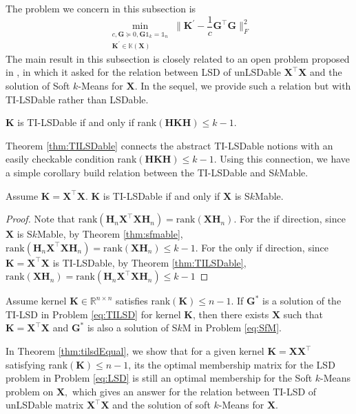 \documentclass[journal]{IEEEtran}
\begin{document}
The problem we concern in this subsection is 
\begin{equation}\label{eq:TILSD}
\min_{\substack{c,\mathbf{G}\succeq 0, \mathbf{G}\mathbb{1}_k = \mathbb{1}_n \\ \mathbf{K}^\prime \in \mathbb{K}(\mathbf{X}) } }
\| \mathbf{K}^\prime - \frac{1}{c}\mathbf{G}^\top\mathbf{G} \|_F^2
\end{equation}
The main result in this subsection is closely related to an open problem proposed in \cite{arora2013similarity},
in which it asked for the relation between LSD of unLSDable $\mathbf{X}^\top\mathbf{X}$ and the solution of Soft $k$-Means for $\mathbf{X}$.
In the sequel, we provide such a relation but with TI-LSDable rather than LSDable.
\begin{thm}\label{thm:TILSDable}
	$\mathbf{K}$ is TI-LSDable if and only if rank$(\mathbf{H}\mathbf{K}\mathbf{H}) \leq k-1$.
\end{thm}
Theorem \ref{thm:TILSDable} connects the abstract TI-LSDable notions with an easily checkable condition rank$(\mathbf{H}\mathbf{K}\mathbf{H}) \leq k-1$.
Using this connection, we have a simple corollary build relation between the TI-LSDable and S$k$Mable.
\begin{corollary}
	Assume $\mathbf{K}=\mathbf{X}^\top\mathbf{X}$. $\mathbf{K}$ is TI-LSDable if and only if $\mathbf{X}$ is S$k$Mable.
\end{corollary}
\begin{proof}
	Note that $\text{rank}(\mathbf{H}_n\mathbf{X}^\top\mathbf{XH}_n) = \text{rank}(\mathbf{XH}_n)$. For the if direction, since $\mathbf{X}$ is S$k$Mable, by Theorem \ref{thm:sfmable}, $\text{rank}(\mathbf{H}_n\mathbf{X}^\top\mathbf{XH}_n) = \text{rank}(\mathbf{XH}_n)\leq k-1$. For the only if direction, since $\mathbf{K}=\mathbf{X}^\top\mathbf{X}$ is TI-LSDable, by Theorem \ref{thm:TILSDable}, 
	$\text{rank}(\mathbf{XH}_n) = \text{rank}(\mathbf{H}_n\mathbf{X}^\top\mathbf{XH}_n) \leq k-1$
\end{proof}
\begin{thm}\label{thm:tilsdEqual}
	Assume kernel $\mathbf{K}\in\mathbb{R}^{n\times n}$ satisfies rank$(\mathbf{K}) \leq n-1$.
	If $\mathbf{G}^*$ is a solution of the TI-LSD in Problem \eqref{eq:TILSD} for kernel $\mathbf{K}$,
	then there exists $\mathbf{X}$ such that $\mathbf{K}=\mathbf{X}^\top\mathbf{X}$ and $\mathbf{G}^*$ is also a solution of S$k$M
	in Problem \eqref{eq:SfM}.
\end{thm}
\begin{remark}
	In Theorem \ref{thm:tilsdEqual}, we show that for a given kernel $\mathbf{K}=\mathbf{XX}^\top$ satisfying rank$(\mathbf{K})\leq n-1$,
	its the optimal  membership matrix for the LSD problem in Problem \eqref{eq:LSD} is still an optimal membership
	for the Soft $k$-Means problem on $\mathbf{X},$
	which gives an answer for the relation between TI-LSD of unLSDable matrix $\mathbf{X}^\top\mathbf{X}$
	and the solution of soft $k$-Means for $\mathbf{X}$.
\end{remark}
\end{document}
